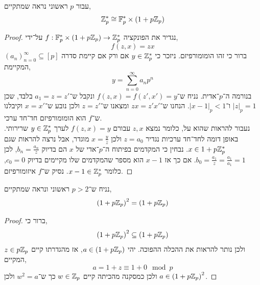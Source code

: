 \question{}
עבור $p$ ראשוני נראה שמתקיים,
\[
	\mathbb{Z}_p^*
	\cong \mathbb{F}_p^* \times (1 + p \mathbb{Z}_p)
\]
\begin{proof}
	נגדיר את הפונקציה $f : \mathbb{F}_p^* \times (1 + p \mathbb{Z}_p) \to \mathbb{Z}_p^*$ על־ידי,
	\[
		f(z, x)
		= z x
	\]
	ברור כי זהו הומומורפיזם.
	ניזכר כי $y \in \mathbb{Z}_p^*$ אם ורק אם קיימת סדרה ${(a_n)}_{n = 0}^{\infty} \subseteq [p]$ המקיימת,
	\[
		y
		= \sum_{n = 0}^\infty a_n p^n
	\]
	בנורמה ה־$p$־אדית.
	נניח ש־$f(z, x) = f(z', x') = y$ ונקבל ש־$a_1 = z = z'$ בלבד, שכן $|z|_p = 1$ ו־$|x - 1|_p < 1$.
	הנחנו ש־$z x = z' x'$ ומצאנו ש־$z = z'$ ולכן נובע ש־$x = x'$ וקיבלנו ש־$f$ הוא הומומורפיזם חד־חד ערכי. \\
	נעבור להראות שהוא על, כלומר נמצא $z, x$ עבורם $f(z, x) = y$ לערך $y \in \mathbb{Z}_p^*$ שרירותי.
	באופן דומה לחד־חד ערכיות נגדיר $z = a_0$ ולכן $x = \frac{y}{z}$ מוגדר, אבל נרצה להראות שגם $x \in 1 + p \mathbb{Z}_p^*$.
	נבחין כי המקדמים בפיתוח ה־$p$־אדי של $x$ הם בדיוק $b_n = \frac{a_n}{z}$, לכן $b_0 = \frac{a_1}{z} = \frac{a_1}{a_1} = 1$.
	אם כך אז $x - 1$ הוא מספר שהמקדמים שלו מקיימים בדיוק $c_0 = 0$, כלומר $x - 1 \in \mathbb{Z}_p^*$.
	נסיק ש־$f$ איזומורפיזם.
\end{proof}

\question{}
נניח ש־$p > 2$ ראשוני ונראה שמתקיים,
\[
	{(1 + p \mathbb{Z}_p)}^2
	= (1 + p \mathbb{Z}_p)	
\]
\begin{proof}
	ברור כי,
	\[
		{(1 + p \mathbb{Z}_p)}^2
		\subseteq (1 + p \mathbb{Z}_p)	
	\]
	ולכן נותר להראות את ההכלה ההפוכה.
	יהי $a \in (1 + p \mathbb{Z}_p)$, אז מהגדרתו קיים $z \in p \mathbb{Z}_p$ המקיים,
	\[
		a
		= 1 + z
		\equiv 1 + 0 \mod p
	\]
	ולכן כמסקנה מהכיתה קיים $w \in \mathbb{Z}_p$ כך ש־$w^2 = a$ ולכן $a \in {(1 + p \mathbb{Z}_p)}^2$.
\end{proof}


